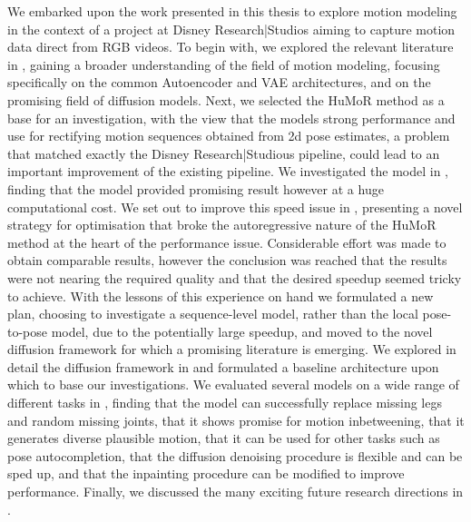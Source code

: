 We embarked upon the work presented in this thesis to explore motion modeling in the context of a project at Disney Research|Studios aiming to capture motion data direct from RGB videos. To begin with, we explored the relevant literature in , gaining a broader understanding of the field of motion modeling, focusing specifically on the common Autoencoder and VAE architectures, and on the promising field of diffusion models. Next, we selected the HuMoR method \cite{humor} as a base for an investigation, with the view that the models strong performance and use for rectifying motion sequences obtained from 2d pose estimates, a problem that matched exactly the Disney Research|Studious pipeline, could lead to an important improvement of the existing pipeline. We investigated the model in , finding that the model provided promising result however at a huge computational cost. We set out to improve this speed issue in , presenting a novel strategy for optimisation that broke the autoregressive nature of the HuMoR method at the heart of the performance issue. Considerable effort was made to obtain comparable results, however the conclusion was reached that the results were not nearing the required quality and that the desired speedup seemed tricky to achieve. With the lessons of this experience on hand we formulated a new plan, choosing to investigate a sequence-level model, rather than the local pose-to-pose model, due to the potentially large speedup, and moved to the novel diffusion framework for which a promising literature is emerging. We explored in detail the diffusion framework in  and formulated a baseline architecture upon which to base our investigations. We evaluated several models on a wide range of different tasks in , finding that the model can successfully replace missing legs and random missing joints, that it shows promise for motion inbetweening, that it generates diverse plausible motion, that it can be used for other tasks such as pose autocompletion, that the diffusion denoising procedure is flexible and can be sped up, and that the inpainting procedure can be modified to improve performance. Finally, we discussed the many exciting future research directions in .
